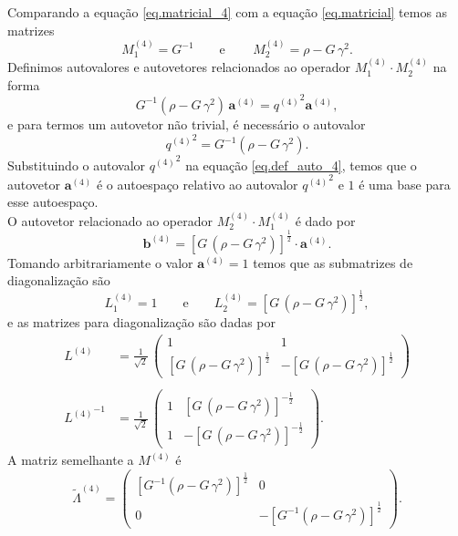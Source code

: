 Comparando a equa\c{c}\~ao \ref{eq.matricial_4} com a equa\c{c}\~ao \ref{eq.matricial} temos as matrizes
\begin{equation*}
M^{(4)}_1=G^{-1}\qquad\text{e}\qquad\,M^{(4)}_2=\rho-G\,\gamma^2.
\end{equation*}
Definimos autovalores e autovetores relacionados ao operador $M^{(4)}_1\cdot M^{(4)}_2$ na forma
\begin{equation}\label{eq.def_auto_4}
G^{-1}(\rho-G\,\gamma^2)\,\mathbf{a}^{(4)}={q^{(4)}}^2\mathbf{a}^{(4)},
\end{equation}
e para termos um autovetor n\~ao trivial, \'e necess\'ario o autovalor
\begin{equation*}
{q^{(4)}}^2=G^{-1}(\rho-G\,\gamma^2).
\end{equation*}
Substituindo o autovalor ${q^{(4)}}^2$ na equa\c{c}\~ao \ref{eq.def_auto_4}, temos que o autovetor $\mathbf{a}^{(4)}$ \'e o autoespa\c{c}o relativo ao autovalor ${q^{(4)}}^2$ e ${1}$ \'e uma base para esse autoespa\c{c}o.\\
O autovetor relacionado ao operador $M^{(4)}_2\cdot M^{(4)}_1$ \'e dado por
\begin{equation*}
\mathbf{b}^{(4)}=[G\,(\rho-G\,\gamma^2)]^{\frac{1}{2}}   \cdot\mathbf{a}^{(4)}.
\end{equation*}
Tomando arbitrariamente o valor $\mathbf{a}^{(4)}=1$ temos que as submatrizes de diagonaliza\c{c}\~ao s\~ao
\begin{equation*}
L^{(4)}_1=1\qquad\text{e}\qquad L^{(4)}_2=[G\,(\rho-G\,\gamma^2)]^{\frac{1}{2}},
\end{equation*}
e as matrizes para diagonaliza\c{c}\~ao s\~ao dadas por
\begin{align*}
L^{(4)}&=\frac{1}{\sqrt{2}}\,
\begin{pmatrix}
1&1\\
[G\,(\rho-G\,\gamma^2)]^{\frac{1}{2}}&-[G\,(\rho-G\,\gamma^2)]^{\frac{1}{2}}
\end{pmatrix}\\\\
{L^{(4)}}^{-1}&=\frac{1}{\sqrt{2}}\,
\begin{pmatrix}
1&[G\,(\rho-G\,\gamma^2)]^{-\frac{1}{2}}\\
1&-[G\,(\rho-G\,\gamma^2)]^{-\frac{1}{2}}
\end{pmatrix}.
\end{align*}
A matriz semelhante a $M^{(4)}$ \'e
\begin{equation*}
\tilde{\Lambda}^{(4)}=
\begin{pmatrix}
[G^{-1}(\rho-G\,\gamma^2)]^{\frac{1}{2}}&0\\
0&-[G^{-1}(\rho-G\,\gamma^2)]^{\frac{1}{2}}
\end{pmatrix}.
\end{equation*}




